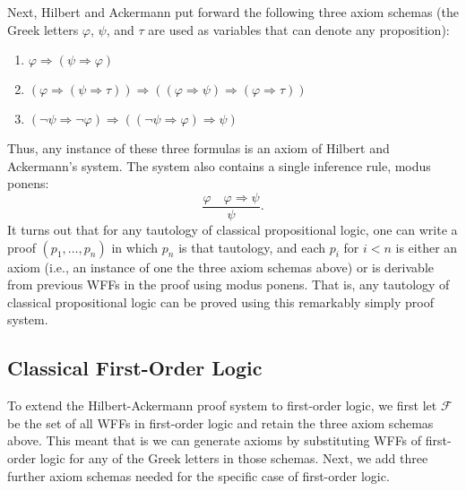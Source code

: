 \documentclass[11pt]{article}
\theoremstyle{definition}
\theoremstyle{remark}
\begin{document}
Next, Hilbert and Ackermann put forward the following three axiom schemas (the Greek letters $\varphi$, $\psi$, and $\tau$ are used as variables that can denote any proposition):
\begin{enumerate}
    \item $\varphi \Rightarrow (\psi \Rightarrow \varphi)$

    \item $(\varphi \Rightarrow (\psi \Rightarrow \tau)) \Rightarrow ((\varphi \Rightarrow \psi)\Rightarrow (\varphi \Rightarrow \tau))$

    \item $(\neg\psi \Rightarrow \neg\varphi)\Rightarrow ((\neg\psi\Rightarrow \varphi)\Rightarrow \psi)$
\end{enumerate}
Thus, any instance of these three formulas is an axiom of Hilbert and Ackermann's system. The system also contains a single inference rule, modus ponens:
$$\frac{\varphi \quad \varphi \Rightarrow \psi}{\psi}.$$
It turns out that for any tautology of classical propositional logic, one can write a proof $(p_{1},\dots,p_{n})$ in which $p_{n}$ is that tautology, and each $p_{i}$ for $i<n$ is either an axiom (i.e., an instance of one the three axiom schemas above) or is derivable from previous WFFs in the proof using modus ponens. That is, any tautology of classical propositional logic can be proved using this remarkably simply proof system.\par 

\subsection{Classical First-Order Logic}
To extend the Hilbert-Ackermann proof system to first-order logic, we first let $\mathcal{F}$ be the set of all WFFs in first-order logic and retain the three axiom schemas above. This meant that is we can generate axioms by substituting WFFs of first-order logic for any of the Greek letters in those schemas. Next, we add three further axiom schemas needed for the specific case of first-order logic.\par 
\end{document}
